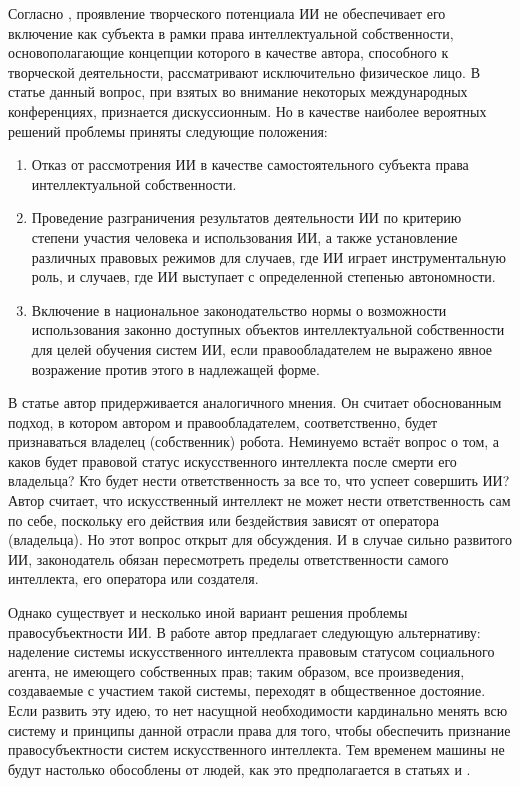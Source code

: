 Согласно \cite{chel},
проявление творческого потенциала ИИ не обеспечивает его включение как субъекта в рамки
права интеллектуальной собственности, основополагающие концепции которого в качестве автора,
способного к творческой деятельности, рассматривают исключительно физическое лицо. В статье
\cite{chel} данный вопрос, при взятых во внимание некоторых международных конференциях,
признается дискуссионным. Но в качестве наиболее вероятных решений проблемы приняты следующие положения:

\begin{enumerate}
\item Отказ от рассмотрения ИИ в качестве самостоятельного субъекта права интеллектуальной собственности.
\item Проведение разграничения результатов деятельности ИИ по критерию степени участия человека и
использования ИИ, а также установление различных правовых режимов для случаев, где ИИ играет
инструментальную роль, и случаев, где ИИ выступает с определенной степенью автономности.
\item Включение в национальное законодательство нормы о возможности использования законно
доступных объектов интеллектуальной собственности для целей обучения систем ИИ, если
правообладателем не выражено явное возражение против этого в надлежащей форме.
\end{enumerate}

В статье \cite{probs} автор придерживается аналогичного мнения. Он считает
обоснованным подход, в котором автором и правообладателем, соответственно,
будет признаваться владелец (собственник) робота. Неминуемо встаёт вопрос о том,
а каков будет правовой статус искусственного интеллекта после смерти его владельца?
Кто будет нести ответственность за все то, что успеет совершить ИИ? Автор считает, что
искусственный интеллект не может нести ответственность сам по себе, поскольку его действия
или бездействия зависят от оператора (владельца). Но этот вопрос открыт для обсуждения. И в
случае сильно развитого ИИ, законодатель обязан пересмотреть пределы ответственности самого
интеллекта, его оператора или создателя.

Однако существует и несколько иной вариант решения проблемы правосубъектности ИИ. В работе
\cite{mor} автор предлагает следующую альтернативу: наделение системы искусственного интеллекта
правовым статусом социального агента, не имеющего собственных прав; таким образом, все произведения,
создаваемые с участием такой системы, переходят в общественное достояние. Если развить эту идею, то
нет насущной необходимости кардинально менять всю систему и принципы данной отрасли права для того,
чтобы обеспечить признание правосубъектности систем искусственного интеллекта. Тем временем машины
не будут настолько обособлены от людей, как это предполагается в статьях \cite{chel} и \cite{probs}.


